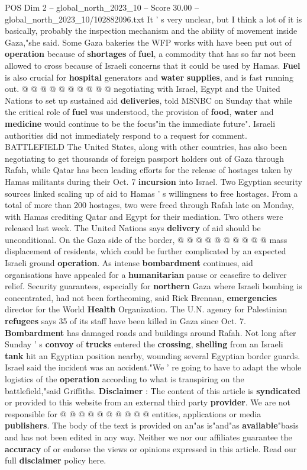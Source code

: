 \begin{textsample}{POS Dim 2 – global\_north\_2023\_10 – Score 30.00 – global\_north\_2023\_10/102882096.txt}
It ' s very unclear, but I think a lot of it is basically, probably the inspection mechanism and the ability of movement inside Gaza,"she said.
Some Gaza bakeries the WFP works with have been put out of \textbf{operation} because of \textbf{shortages} of \textbf{fuel}, a commodity that has so far not been allowed to cross because of Israeli concerns that it could be used by Hamas. \textbf{Fuel} is also crucial for \textbf{hospital} generators and \textbf{water} \textbf{supplies}, and is fast running out. @ @ @ @ @ @ @ @ @ @ negotiating with Israel, Egypt and the United Nations to set up sustained aid \textbf{deliveries}, told MSNBC on Sunday that while the critical role of \textbf{fuel} was understood, the provision of \textbf{food}, \textbf{water} and \textbf{medicine} would continue to be the focus"in the immediate future".
Israeli authorities did not immediately respond to a request for comment.
BATTLEFIELD The United States, along with other countries, has also been negotiating to get thousands of foreign passport holders out of Gaza through Rafah, while Qatar has been leading efforts for the release of hostages taken by Hamas militants during their Oct. 7 \textbf{incursion} into Israel.
Two Egyptian security sources linked scaling up of aid to Hamas ' s willingness to free hostages.
From a total of more than 200 hostages, two were freed through Rafah late on Monday, with Hamas crediting Qatar and Egypt for their mediation.
Two others were released last week.
The United Nations says \textbf{delivery} of aid should be unconditional.
On the Gaza side of the border, @ @ @ @ @ @ @ @ @ @ mass displacement of residents, which could be further complicated by an expected Israeli ground \textbf{operation}.
As intense \textbf{bombardment} continues, aid organisations have appealed for a \textbf{humanitarian} pause or ceasefire to deliver relief.
Security guarantees, especially for \textbf{northern} Gaza where Israeli bombing is concentrated, had not been forthcoming, said Rick Brennan, \textbf{emergencies} director for the World \textbf{Health} Organization.
The U.N. agency for Palestinian \textbf{refugees} says 35 of its staff have been killed in Gaza since Oct. 7. \textbf{Bombardment} has damaged roads and buildings around Rafah.
Not long after Sunday ' s \textbf{convoy} of \textbf{trucks} entered the \textbf{crossing}, \textbf{shelling} from an Israeli \textbf{tank} hit an Egyptian position nearby, wounding several Egyptian border guards.
Israel said the incident was an accident."We ' re going to have to adapt the whole logistics of the \textbf{operation} according to what is transpiring on the battlefield,"said Griffiths. \textbf{Disclaimer} : The content of this article is \textbf{syndicated} or provided to this website from an external third party \textbf{provider}.
We are not responsible for @ @ @ @ @ @ @ @ @ @ entities, applications or media \textbf{publishers}.
The body of the text is provided on an"as is"and"as \textbf{available}"basis and has not been edited in any way.
Neither we nor our affiliates guarantee the \textbf{accuracy} of or endorse the views or opinions expressed in this article.
Read our full \textbf{disclaimer} policy here.


\end{textsample}
